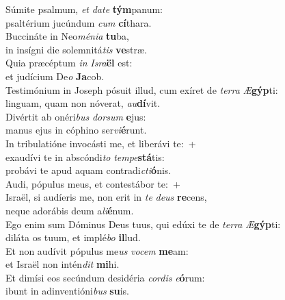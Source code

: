 \evenverse Súmite psalmum, \textit{et} \textit{da}\textit{te} \textbf{tým}panum:~\*\\
\evenverse psaltérium jucúndum \textit{cum} \textbf{cí}thara.\\
\oddverse Buccináte in Neo\textit{mé}\textit{ni}\textit{a} \textbf{tu}ba,~\*\\
\oddverse in insígni die solemnitá\textit{tis} \textbf{ve}stræ.\\
\evenverse Quia præcéptum \textit{in} \textit{Is}\textit{ra}\textbf{ël} est:~\*\\
\evenverse et judícium De\textit{o} \textbf{Ja}cob.\\
\oddverse Testimónium in Joseph pósuit illud, cum exíret de \textit{ter}\textit{ra} \textit{Æ}\textbf{gýp}ti:~\*\\
\oddverse linguam, quam non nóverat, \textit{au}\textbf{dí}vit.\\
\evenverse Divértit ab onéri\textit{bus} \textit{dor}\textit{sum} \textbf{e}jus:~\*\\
\evenverse manus ejus in cóphino ser\textit{vi}\textbf{é}runt.\\
\oddverse In tribulatióne invocásti me, et liberávi te:~+\\
\oddverse  exaudívi te in abscóndi\textit{to} \textit{tem}\textit{pe}\textbf{stá}tis:~\*\\
\oddverse probávi te apud aquam contradi\textit{cti}\textbf{ó}nis.\\
\evenverse Audi, pópulus meus, et contestábor te:~+\\
\evenverse  Israël, si audíeris me, non erit in \textit{te} \textit{de}\textit{us} \textbf{re}cens,~\*\\
\evenverse neque adorábis deum a\textit{li}\textbf{é}num.\\
\oddverse Ego enim sum Dóminus Deus tuus, qui edúxi te de \textit{ter}\textit{ra} \textit{Æ}\textbf{gýp}ti:~\*\\
\oddverse diláta os tuum, et implé\textit{bo} \textbf{il}lud.\\
\evenverse Et non audívit pópulus me\textit{us} \textit{vo}\textit{cem} \textbf{me}am:~\*\\
\evenverse et Israël non intén\textit{dit} \textbf{mi}hi.\\
\oddverse Et dimísi eos secúndum desidéria \textit{cor}\textit{dis} \textit{e}\textbf{ó}rum:~\*\\
\oddverse ibunt in adinventióni\textit{bus} \textbf{su}is.\\
